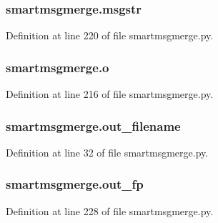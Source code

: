 \subsubsection[{\texorpdfstring{msgstr}{msgstr}}]{\setlength{\rightskip}{0pt plus 5cm}smartmsgmerge.\+msgstr}\hypertarget{namespacesmartmsgmerge_a5cff4f721c780040fcb1fda07e48977e}{}\label{namespacesmartmsgmerge_a5cff4f721c780040fcb1fda07e48977e}


Definition at line 220 of file smartmsgmerge.\+py.

\subsubsection[{\texorpdfstring{o}{o}}]{\setlength{\rightskip}{0pt plus 5cm}smartmsgmerge.\+o}\hypertarget{namespacesmartmsgmerge_aba35baca6a2a8d4f665ba30724f4739a}{}\label{namespacesmartmsgmerge_aba35baca6a2a8d4f665ba30724f4739a}


Definition at line 216 of file smartmsgmerge.\+py.

\subsubsection[{\texorpdfstring{out\+\_\+filename}{out_filename}}]{\setlength{\rightskip}{0pt plus 5cm}smartmsgmerge.\+out\+\_\+filename}\hypertarget{namespacesmartmsgmerge_aec8072bf6d17bfc67ac570315b42fc3b}{}\label{namespacesmartmsgmerge_aec8072bf6d17bfc67ac570315b42fc3b}


Definition at line 32 of file smartmsgmerge.\+py.

\subsubsection[{\texorpdfstring{out\+\_\+fp}{out_fp}}]{\setlength{\rightskip}{0pt plus 5cm}smartmsgmerge.\+out\+\_\+fp}\hypertarget{namespacesmartmsgmerge_a5646c202b8354546c4cc16999c200cd6}{}\label{namespacesmartmsgmerge_a5646c202b8354546c4cc16999c200cd6}


Definition at line 228 of file smartmsgmerge.\+py.

